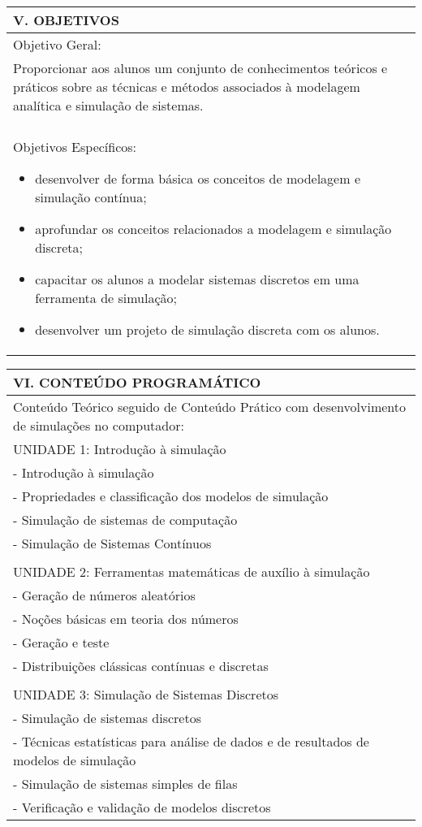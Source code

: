 \documentclass[12pt]{article}
\begin{document}
\begin{longtable}{|L{1.025\textwidth}|} \hline
%
{\bf V. OBJETIVOS } \\ \hline
%
Objetivo Geral: \\
Proporcionar aos alunos um conjunto de conhecimentos teóricos e práticos sobre as técnicas e métodos associados à modelagem analítica e simulação de sistemas.\\
\\
Objetivos Específicos:
\begin{itemize}
\item desenvolver de forma básica os conceitos de modelagem e simulação contínua;
\item aprofundar os conceitos relacionados a modelagem e simulação discreta;
\item capacitar os alunos a modelar sistemas discretos em uma ferramenta de simulação;
\item desenvolver um projeto de simulação discreta com os alunos.
\end{itemize}
\\ \hline
\end{longtable}


\begin{longtable}{|L{1.025\textwidth}|} \hline
%
{\bf VI. CONTEÚDO PROGRAMÁTICO } \\ \hline
Conteúdo Teórico seguido de Conteúdo Prático com desenvolvimento de simulações no computador:\\
UNIDADE 1: Introdução à simulação\\
- Introdução à simulação\\
- Propriedades e classificação dos modelos de simulação\\
- Simulação de sistemas de computação\\
- Simulação de Sistemas Contínuos\\
\\
UNIDADE 2: Ferramentas matemáticas de auxílio à simulação \\
- Geração de números aleatórios\\
- Noções básicas em teoria dos números\\
- Geração e teste\\
- Distribuições clássicas contínuas e discretas\\
\\
UNIDADE 3: Simulação de Sistemas Discretos\\
- Simulação de sistemas discretos\\
- Técnicas estatísticas para análise de dados e de resultados de modelos de simulação\\
- Simulação de sistemas simples de filas\\
- Verificação e validação de modelos discretos
\\ \hline
\end{longtable} 
\end{document}
